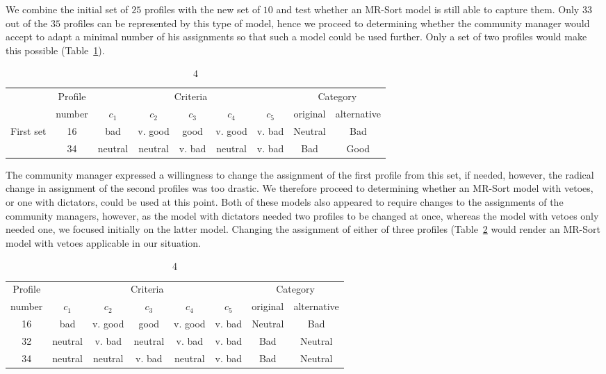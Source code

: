 We combine the initial set of $25$ profiles with the new set of $10$ and test whether an MR-Sort model is still able to capture them. Only $33$ out of the $35$ profiles can be represented by this type of model, hence we proceed to determining whether the community manager would accept to adapt a minimal number of his assignments so that such a model could be used further. Only a set of two profiles would make this possible (Table~\ref{tab:ex2-step4a}).

\begin{table}
\caption{4}\label{tab:ex2-step4a}
\small

\begin{tabular}{ccccccc|cc}
&Profile& \multicolumn{5}{c}{Criteria} & \multicolumn{2}{|c}{Category} \\
&number& $c_1$ & $c_2$ & $c_3$ & $c_4$ & $c_5$ & \multicolumn{1}{c}{original} & \multicolumn{1}{c}{alternative} \\\hline
\multirow{2}{*}{First set}& 16&    bad & v. good &    good & v. good &  v. bad &  Neutral & Bad \\
& 34& neutral & neutral & v. bad & neutral & v. bad &  Bad & Good \\
\end{tabular}
\end{table}

The community manager expressed a willingness to change the assignment of the first profile from this set, if needed, however, the radical change in assignment of the second profiles was too drastic. We therefore proceed to determining whether an MR-Sort model with vetoes, or one with dictators, could be used at this point. Both of these models also appeared to require changes to the assignments of the community managers, however, as the model with dictators needed two profiles to be changed at once, whereas the model with vetoes only needed one, we focused initially on the latter model. Changing the assignment of either of three profiles (Table~\ref{tab:ex2-step4b} would render an MR-Sort model with vetoes applicable in our situation.

\begin{table}
\caption{4}\label{tab:ex2-step4b}
\small

\begin{tabular}{cccccc|cc}
Profile& \multicolumn{5}{c}{Criteria} & \multicolumn{2}{|c}{Category} \\
number& $c_1$ & $c_2$ & $c_3$ & $c_4$ & $c_5$ & \multicolumn{1}{c}{original} & \multicolumn{1}{c}{alternative} \\\hline
 16&    bad & v. good &    good & v. good &  v. bad &  Neutral & Bad \\\hline
 32& neutral & v. bad & neutral & v. bad & v. bad &  Bad & Neutral \\\hline
 34& neutral & neutral & v. bad & neutral & v. bad &  Bad & Neutral \\
\end{tabular}
\end{table}

